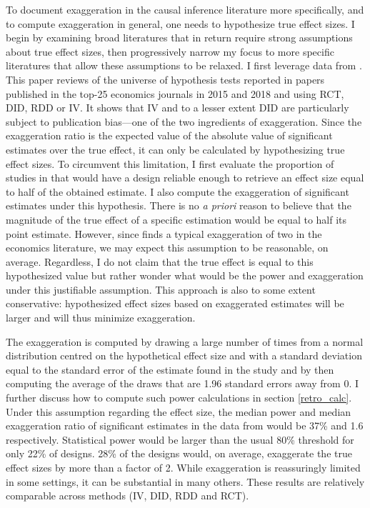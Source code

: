 \documentclass[usletter, 12pt]{article}
\begin{document}
				To document exaggeration in the causal inference literature more specifically, and to compute exaggeration in general, one needs to  hypothesize true effect sizes. I begin by examining broad literatures that in return require strong assumptions about true effect sizes, then progressively narrow my focus to more specific literatures that allow these assumptions to be relaxed. I first leverage data from \cite{brodeur_methods_2020}. This paper reviews of the universe of hypothesis tests reported in papers published in the top-25 economics journals in 2015 and 2018 and using RCT, DID, RDD or IV. It shows that IV and to a lesser extent DID are particularly subject to publication bias---one of the two ingredients of exaggeration. 
			Since the exaggeration ratio is the expected value of the absolute value of significant estimates over the true effect, it can only be calculated by hypothesizing true effect sizes. 
			To circumvent this limitation, I first evaluate the proportion of studies in \cite{brodeur_methods_2020} that would have a design reliable enough to retrieve an effect size equal to half of the obtained estimate. I also compute the exaggeration of significant estimates under this hypothesis. There is no \textit{a priori} reason to believe that the magnitude of the true effect of a specific estimation would be equal to half its point estimate. However, since \cite{ioannidis_power_2017} finds a typical exaggeration of two in the economics literature, we may expect this assumption to be reasonable, on average. Regardless, I do not claim that the true effect is equal to this hypothesized value but rather wonder what would be the power and exaggeration under this justifiable assumption. This approach is also to some extent conservative: hypothesized effect sizes based on exaggerated estimates will be larger and will thus minimize exaggeration.
			
			 The exaggeration is computed by drawing a large number of times from a normal distribution centred on the hypothetical effect size and with a standard deviation equal to the standard error of the estimate found in the study and by then computing the average of the draws that are 1.96 standard errors away from 0. I further discuss how to compute such power calculations in section \ref{retro_calc}. Under this assumption regarding the effect size, the median power and median exaggeration ratio of significant estimates in the data from \cite{brodeur_methods_2020} would be 37\% and 1.6 respectively. Statistical power would be larger than the usual 80\% threshold for only 22\% of designs. 28\% of the designs would, on average, exaggerate the true effect sizes by more than a factor of 2. While exaggeration is reassuringly limited in some settings, it can be substantial in many others. These results are relatively comparable across methods (IV, DID, RDD and RCT). 
			
\end{document}
